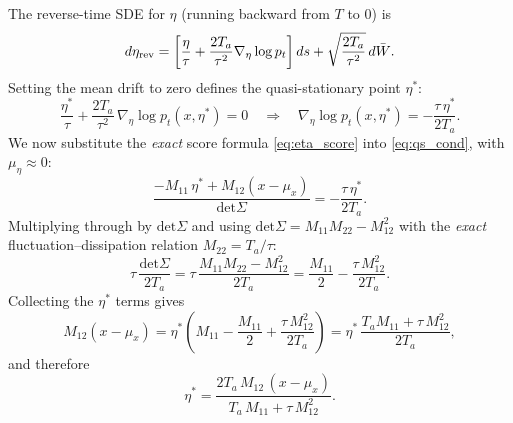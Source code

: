 \documentclass[11pt]{article}
\newcommand{\Ta}{T_a}
\newcommand{\tauu}{\tau}
\renewcommand{\det}{\mathrm{det}}
\begin{document}
The reverse-time SDE for $\eta$ (running backward from $T$ to $0$) is
\begin{equation}
d\eta_{\rm rev} = \left[\frac{\eta}{\tauu}
+ \frac{2\Ta}{\tauu^2}\nabla_\eta\log p_t\right]ds + \sqrt{\frac{2\Ta}{\tauu^2}}\,d\bar W.
\label{eq:rev_sde_eta}
\end{equation}
Setting the mean drift to zero defines the quasi-stationary point $\eta^*$:
\begin{equation}
\frac{\eta^*}{\tauu} + \frac{2\Ta}{\tauu^2}\,\nabla_\eta\log p_t(x,\eta^*) = 0
\quad\Longrightarrow\quad
\nabla_\eta\log p_t(x,\eta^*) = -\frac{\tauu\,\eta^*}{2\Ta}.
\label{eq:qs_cond}
\end{equation}
We now substitute the \emph{exact} score formula \eqref{eq:eta_score} into \eqref{eq:qs_cond},
with $\mu_\eta\approx 0$:
\begin{equation}
\frac{-M_{11}\,\eta^* + M_{12}(x-\mu_x)}{\det\Sigma}
= -\frac{\tauu\,\eta^*}{2\Ta}.
\end{equation}
Multiplying through by $\det\Sigma$ and using $\det\Sigma = M_{11}M_{22} - M_{12}^2$
with the \emph{exact} fluctuation--dissipation relation $M_{22} = \Ta/\tauu$:
\begin{equation}
\tauu\,\frac{\det\Sigma}{2\Ta}
= \tauu\,\frac{M_{11}M_{22}-M_{12}^2}{2\Ta}
= \frac{M_{11}}{2} - \frac{\tauu\,M_{12}^2}{2\Ta}.
\end{equation}
Collecting the $\eta^*$ terms gives
\begin{equation}
M_{12}(x-\mu_x)
= \eta^*\!\left(M_{11} - \frac{M_{11}}{2} + \frac{\tauu\,M_{12}^2}{2\Ta}\right)
= \eta^*\,\frac{T_a M_{11} + \tauu\,M_{12}^2}{2\Ta},
\end{equation}
and therefore
\begin{equation}
\boxed{\eta^* = \frac{2\Ta\,M_{12}\,(x-\mu_x)}{\Ta\,M_{11} + \tauu\,M_{12}^2}}.
\label{eq:eta_star}
\end{equation}
\end{document}
